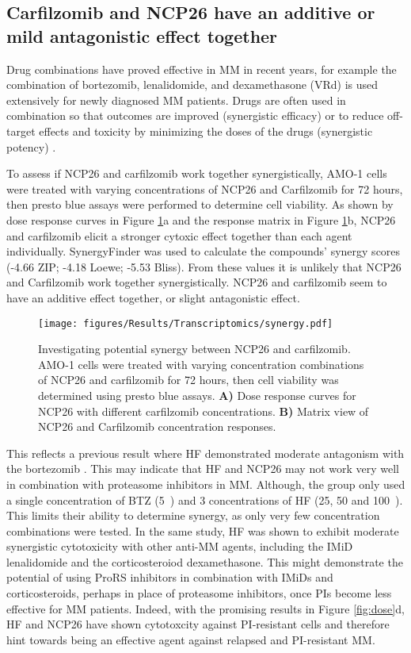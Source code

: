 \subsection{Carfilzomib and NCP26 have an additive or mild antagonistic effect together}\label{subsec:synergy}
Drug combinations have proved effective in MM in recent years, for example the combination of bortezomib, lenalidomide, and dexamethasone (VRd) is used extensively for newly diagnosed MM patients.
Drugs are often used in combination so that outcomes are improved (synergistic efficacy) or to reduce off-target effects and toxicity by minimizing the doses of the drugs (synergistic potency) \cite{meyer2019quantifying}.

To assess if NCP26 and carfilzomib work together synergistically, AMO-1 cells were treated with varying concentrations of NCP26 and Carfilzomib for 72 hours, then presto blue assays were performed to determine cell viability.
As shown by dose response curves in Figure \ref{fig:synergy}a and the response matrix in Figure \ref{fig:synergy}b, NCP26 and carfilzomib elicit a stronger cytoxic effect together than each agent individually.
SynergyFinder \cite{zheng2021synergyfinder} was used to calculate the compounds' synergy scores (-4.66 ZIP; -4.18 Loewe; -5.53 Bliss).
From these values it is unlikely that NCP26 and Carfilzomib work together synergistically.
NCP26 and carfilzomib seem to have an additive effect together, or slight antagonistic effect.
\begin{figure}[h]
\centering
\texttt{[image: figures/Results/Transcriptomics/synergy.pdf]}
\caption[NCP26 and carfilzomib synergism]{Investigating potential synergy between NCP26 and carfilzomib.
AMO-1 cells were treated with varying concentration combinations of NCP26 and carfilzomib for 72 hours, then cell viability was determined using presto blue assays.
\textbf{A)} Dose response curves for NCP26 with different carfilzomib concentrations.
\textbf{B)} Matrix view of NCP26 and Carfilzomib concentration responses.
}
\label{fig:synergy}
\end{figure}
This reflects a previous result where HF demonstrated moderate antagonism with the bortezomib \cite{leiba2012halofuginone}.
This may indicate that HF and NCP26 may not work very well in combination with proteasome inhibitors in MM.
Although, the group only used a single concentration of BTZ (5\si{\nano\Molar}) and 3 concentrations of HF (25, 50 and 100\si{\nano\Molar}).
This limits their ability to determine synergy, as only very few concentration combinations were tested.
In the same study, HF was shown to exhibit moderate synergistic cytotoxicity with other anti-MM agents, including the IMiD lenalidomide and the corticosteroiod dexamethasone.
This might demonstrate the potential of using ProRS inhibitors in combination with IMiDs and corticosteroids, perhaps in place of proteasome inhibitors, once PIs become less effective for MM patients.
Indeed, with the promising results in Figure \ref{fig:dose}d, HF and NCP26 have shown cytotoxcity against PI-resistant cells and therefore hint towards being an effective agent against relapsed and PI-resistant MM\@.

